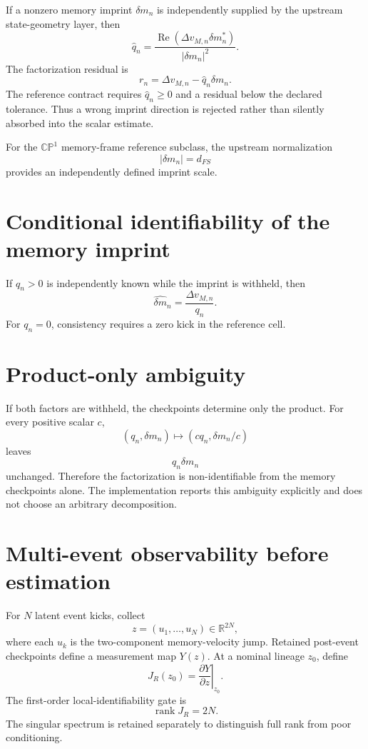 If a nonzero memory imprint \(\delta m_n\) is independently supplied by the upstream state-geometry layer, then
\[
\boxed{
\widehat q_n
=
\frac{\operatorname{Re}(\Delta v_{M,n}\delta m_n^*)}
{|\delta m_n|^2}.
}
\]
The factorization residual is
\[
\boxed{
r_n
=\Delta v_{M,n}-\widehat q_n\delta m_n.
}
\]
The reference contract requires \(\widehat q_n\ge0\) and a residual below the declared tolerance. Thus a wrong imprint direction is rejected rather than silently absorbed into the scalar estimate.

For the \(\mathbb{CP}^1\) memory-frame reference subclass, the upstream normalization
\[
|\delta m_n|=d_{FS}
\]
provides an independently defined imprint scale.

\section{Conditional identifiability of the memory imprint}

If \(q_n>0\) is independently known while the imprint is withheld, then
\[
\boxed{
\widehat{\delta m}_n
=\frac{\Delta v_{M,n}}{q_n}.
}
\]
For \(q_n=0\), consistency requires a zero kick in the reference cell.

\section{Product-only ambiguity}

If both factors are withheld, the checkpoints determine only the product. For every positive scalar \(c\),
\[
\boxed{
(q_n,\delta m_n)
\mapsto
(cq_n,\delta m_n/c)
}
\]
leaves
\[
q_n\delta m_n
\]
unchanged. Therefore the factorization is non-identifiable from the memory checkpoints alone. The implementation reports this ambiguity explicitly and does not choose an arbitrary decomposition.

\section{Multi-event observability before estimation}

For \(N\) latent event kicks, collect
\[
z=(u_1,\ldots,u_N)\in\mathbb R^{2N},
\]
where each \(u_k\) is the two-component memory-velocity jump. Retained post-event checkpoints define a measurement map \(Y(z)\). At a nominal lineage \(z_0\), define
\[
\boxed{
J_R(z_0)=\left.\frac{\partial Y}{\partial z}\right|_{z_0}.
}
\]
The first-order local-identifiability gate is
\[
\boxed{\operatorname{rank}J_R=2N.}
\]
The singular spectrum is retained separately to distinguish full rank from poor conditioning.

